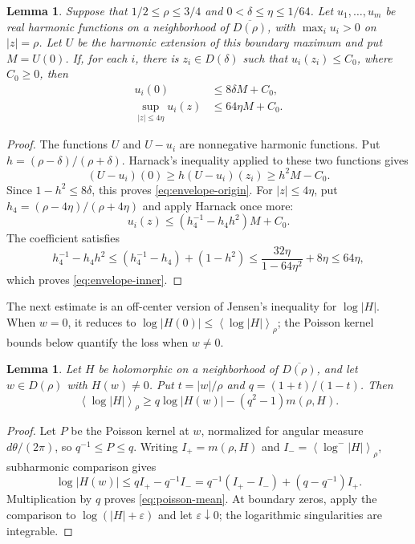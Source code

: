 \documentclass[12pt,letterpaper,reqno]{amsart}
\newtheorem{lem}[thm]{Lemma}
\theoremstyle{definition}
\numberwithin{equation}{section}
\newcommand{\mean}[2]{\left\langle #1\right\rangle_{#2}}
\begin{document}
	\begin{lem}\label{lem:envelope}
		Suppose that $1/2\le\rho\le3/4$ and $0<\delta\le\eta\le1/64$.
		Let $u_1,\ldots,u_m$ be real harmonic functions on a neighborhood of
		$\overline{D(\rho)}$, with $\max_i u_i>0$ on $|z|=\rho$.
		Let $U$ be the harmonic extension of this boundary maximum and put
		$M=U(0)$. If, for each $i$, there is $z_i\in D(\delta)$ such that
		$u_i(z_i)\le C_0$, where $C_0\ge0$, then
		\begin{align}
			u_i(0)&\le8\delta M+C_0,\label{eq:envelope-origin}\\
			\sup_{|z|\le4\eta}u_i(z)&\le64\eta M+C_0.\label{eq:envelope-inner}
		\end{align}
	\end{lem}
	
	\begin{proof}
		The functions $U$ and $U-u_i$ are nonnegative harmonic functions.
		Put $h=(\rho-\delta)/(\rho+\delta)$.
		Harnack's inequality applied to these two functions gives
		\[
		(U-u_i)(0)\ge h(U-u_i)(z_i)\ge h^2M-C_0.
		\]
		Since $1-h^2\le8\delta$, this proves
		\eqref{eq:envelope-origin}.
		For $|z|\le4\eta$, put
		$h_4=(\rho-4\eta)/(\rho+4\eta)$ and apply Harnack once more:
		\[
		u_i(z)\le(h_4^{-1}-h_4 h^2)M+C_0.
		\]
		The coefficient satisfies
		\[
		h_4^{-1}-h_4 h^2
		\le(h_4^{-1}-h_4)+(1-h^2)
		\le\frac{32\eta}{1-64\eta^2}+8\eta\le64\eta,
		\]
		which proves \eqref{eq:envelope-inner}.
	\end{proof}
	
	The next estimate is an off-center version of Jensen's inequality
	for $\log|H|$. When $w=0$, it reduces to
	$\log|H(0)|\le\mean{\log|H|}{\rho}$; the Poisson kernel bounds below
	quantify the loss when $w\ne0$.
	
	\begin{lem}\label{lem:poisson-mean}
		Let $H$ be holomorphic on a neighborhood of $\overline{D(\rho)}$,
		and let $w\in D(\rho)$ with $H(w)\ne0$.
		Put $t=|w|/\rho$ and $q=(1+t)/(1-t)$. Then
		\begin{equation}\label{eq:poisson-mean}
			\mean{\log|H|}{\rho}
			\ge q\log|H(w)|-(q^2-1)m(\rho,H).
		\end{equation}
	\end{lem}
	
	\begin{proof}
		Let $P$ be the Poisson kernel at $w$, normalized for angular measure
		$d\theta/(2\pi)$, so $q^{-1}\le P\le q$.
		Writing $I_+=m(\rho,H)$ and
		$I_-=\mean{\log^-|H|}{\rho}$, subharmonic comparison gives
		\[
		\log|H(w)|\le qI_+-q^{-1}I_-
		=q^{-1}(I_+-I_-)+(q-q^{-1})I_+.
		\]
		Multiplication by $q$ proves \eqref{eq:poisson-mean}.
		At boundary zeros, apply the comparison to $\log(|H|+\varepsilon)$
		and let $\varepsilon\downarrow0$; the logarithmic singularities are
		integrable.
	\end{proof}
	
\end{document}
